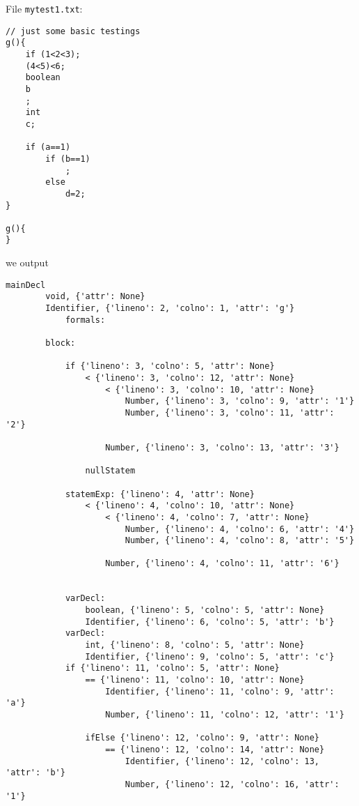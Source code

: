 \documentclass{article}
\begin{document}
\begin{itemize}
        File \verb|mytest1.txt|:
        \begin{verbatim}
// just some basic testings
g(){
    if (1<2<3);
    (4<5)<6;
    boolean
    b
    ;
    int
    c;

    if (a==1)
        if (b==1)
            ;
        else
            d=2;
}

g(){
}
        \end{verbatim}
        we output
        \begin{verbatim}
mainDecl
        void, {'attr': None}
        Identifier, {'lineno': 2, 'colno': 1, 'attr': 'g'}
            formals:

        block:

            if {'lineno': 3, 'colno': 5, 'attr': None}
                < {'lineno': 3, 'colno': 12, 'attr': None}
                    < {'lineno': 3, 'colno': 10, 'attr': None}
                        Number, {'lineno': 3, 'colno': 9, 'attr': '1'}
                        Number, {'lineno': 3, 'colno': 11, 'attr': '2'}

                    Number, {'lineno': 3, 'colno': 13, 'attr': '3'}

                nullStatem

            statemExp: {'lineno': 4, 'attr': None}
                < {'lineno': 4, 'colno': 10, 'attr': None}
                    < {'lineno': 4, 'colno': 7, 'attr': None}
                        Number, {'lineno': 4, 'colno': 6, 'attr': '4'}
                        Number, {'lineno': 4, 'colno': 8, 'attr': '5'}

                    Number, {'lineno': 4, 'colno': 11, 'attr': '6'}


            varDecl:
                boolean, {'lineno': 5, 'colno': 5, 'attr': None}
                Identifier, {'lineno': 6, 'colno': 5, 'attr': 'b'}
            varDecl:
                int, {'lineno': 8, 'colno': 5, 'attr': None}
                Identifier, {'lineno': 9, 'colno': 5, 'attr': 'c'}
            if {'lineno': 11, 'colno': 5, 'attr': None}
                == {'lineno': 11, 'colno': 10, 'attr': None}
                    Identifier, {'lineno': 11, 'colno': 9, 'attr': 'a'}
                    Number, {'lineno': 11, 'colno': 12, 'attr': '1'}

                ifElse {'lineno': 12, 'colno': 9, 'attr': None}
                    == {'lineno': 12, 'colno': 14, 'attr': None}
                        Identifier, {'lineno': 12, 'colno': 13, 'attr': 'b'}
                        Number, {'lineno': 12, 'colno': 16, 'attr': '1'}


\end{verbatim}
\end{itemize}
\end{document}
